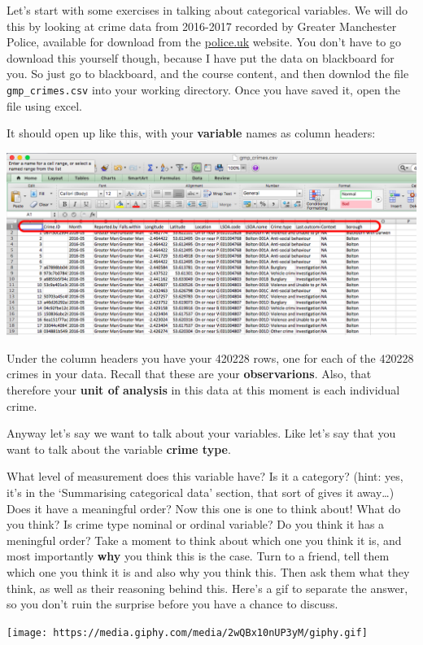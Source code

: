 \documentclass[]{book}
\theoremstyle{definition}
\theoremstyle{definition}
\theoremstyle{definition}
\theoremstyle{remark}
\begin{document}
{ Let's start with some exercises in talking about categorical
variables. We will do this by looking at crime data from 2016-2017
recorded by Greater Manchester Police, available for download from the
\url{police.uk} website. You don't have to go download this yourself
though, because I have put the data on blackboard for you. So just go to
blackboard, and the course content, and then downlod the file
\texttt{gmp\_crimes.csv} into your working directory. Once you have
saved it, open the file using excel. }

It should open up like this, with your \textbf{variable} names as column
headers:

\includegraphics{imgs/open_gmp_crimes.png}

Under the column headers you have your 420228 rows, one for each of the
420228 crimes in your data. Recall that these are your
\textbf{observarions}. Also, that therefore your \textbf{unit of
analysis} in this data at this moment is each individual crime.

Anyway let's say we want to talk about your variables. Like let's say
that you want to talk about the variable \textbf{crime type}.

{ What level of measurement does this variable have? Is it a category?
(hint: yes, it's in the `Summarising categorical data' section, that
sort of gives it away\ldots{}) Does it have a meaningful order? Now this
one is one to think about! What do you think? Is crime type nominal or
ordinal variable? Do you think it has a meningful order? Take a moment
to think about which one you think it is, and most importantly
\textbf{why} you think this is the case. Turn to a friend, tell them
which one you think it is and also why you think this. Then ask them
what they think, as well as their reasoning behind this. Here's a gif to
separate the answer, so you don't ruin the surprise before you have a
chance to discuss. }

\texttt{[image: https://media.giphy.com/media/2wQBx10nUP3yM/giphy.gif]}
\end{document}

